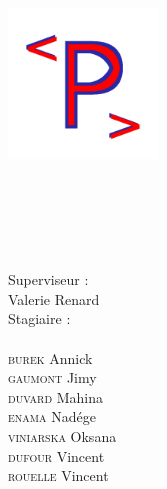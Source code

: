 \begin{titlepage}
\enlargethispage{2cm}
\includegraphics[width=0.3\textwidth]{./logo/P.png}

\setlength{\columnseprule}{.5mm}
\begin{multicols}{2}\raggedright
	\ecole{}\\
	\vspace*{.5cm}
	\\
	\vspace*{.5cm}
	\diplome{ }\\
	
	\columnbreak
	
	\textsc{\@title}
	\VRule 
	\vspace*{.2cm}\\
	\large{Superviseur : }\\
	\large{Valerie Renard} 
	\vspace*{.5cm}\\	
	\large{Stagiaire : }\\
	\large{\@author} \\
	\large{\textsc{burek} Annick} \\
	\large{\textsc{gaumont} Jimy} \\
	\large{\textsc{duvard} Mahina} \\
	\large{\textsc{enama} Nadége} \\
	\large{\textsc{viniarska} Oksana} \\
	\large{\textsc{dufour} Vincent} \\
	\large{\textsc{rouelle} Vincent} \\
	\vspace*{.2cm}\\
	
	
	\begin{center}
	\end{center}
\end{multicols}
\vspace*{6.3cm}

\end{titlepage}
\ClearShipoutPicture
